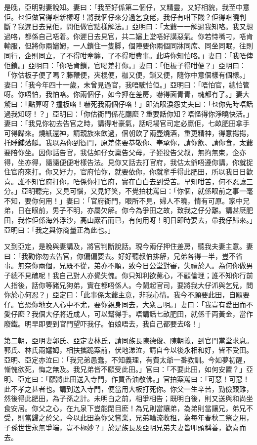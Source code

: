 \documentclass[a5paper, 12pt, openany]{book} %
\begin{document}
	是晚，亞明對妻說知。妻曰：「我至好係第二個仔，又精靈，又好相貌，我至中意佢。乜佢做官得咁新樣呀！將我個仔來分過乞食佬，我仔有咁下賤？佢得咁曉判斷？我遲日去見佢，問佢做官點樣解法。」亞明曰：「太爺一一解過我知咯。我又想過咯，都係自己唔着。你遲日去見官，共二嬸上堂唔好講惡氣。你若恃嘴刁，唔肯輸服，但將你兩嬸姆，一人鎖住一隻脚，個陣要你兩個同牀同席、同坐同眠，往則同行，企則同立，了不得咁牽纏，了不得咁費事。此時你知怕咯。」妻曰：「我唔俾佢鎖。」亞明曰：「你唔肯鎖，官喝差打你。」妻曰：「佢板子得咁便？」亞明曰：「你估板子便了嗎？藤鞭便，夾棍便，枷又便，鎖又便，隨你中意個樣有個樣。」妻曰：「我今年四十一歲，未曾見過官，我唔駛怕佢。」亞明曰：「唔怕官，總怕管呀。你唔怕，我怕咯。你兩個仔，如今押在差房，嚇得面青青，魂都冇了。」妻大驚曰：「點算呀？撞板咯！嚇死我兩個仔咯！」即流眼淚怨丈夫曰：「乜你先時唔話過我知呀！？」亞明曰：「你估衙門係花廳麽？重要話你知？唔怪得你淨曉快活。」妻曰：「我見你初去告官之時，講得咁豪氣，話呢場官司定必贏佢，七畝肥田拿手可得歸來。燒紙還神，請親族來飲過，個朝飲了兩壺燒酒，重更精神，得意揚揚，托睡鋪落艇。我以為你到衙門，原差佬要恭敬你、奉承你，請你飲、請你食，太爺要陪你坐。因你話告官，我估如仔女稟告父母，子姪投告父叔，無拘無束，企亦得，坐亦得，隨隨便便咁樣告法。見你又話去打官府，我估太爺唔遵你講，你就捉住官府來打。你又好力，官府怕你，就要依你，你就拿手得此肥田，所以我日日歡喜。誰不知官府打你，唔係你打官府，實在白白去到受苦。早知咁苦，何不忍讓三分。」亞明聽完，又見可惱，又見好笑，不覺拍枕罵曰：「你個，就係眼前之事一毫不知，要你何用！」妻曰：「官府衙門，眼所不見，婦人不曉，情有可原。家中兄弟，日在眼前，男子不明，亦屬欠解。你今為爭田之故，致我之仔分離。講甚麽肥田，我作佢係海外浮沙，高山巖石而已，有何用呀！明日即時要去，帶我仔歸來。」亞明曰：「我之與你商量正為此也。」

	又到亞定，是晚與妻講及，將官判斷說話。現今兩仔押住差房，聽我夫妻主意。妻曰：「我勸你勿去告官，你偏偏要去。好好聽叔伯排解，兄弟各得一半，豈不省事。無奈你兩個，兄既不從，弟亦不順，致今日公堂對審，失禮於人。為何你做男子總不見醜呢！我自己對人亦覺失愧。你只知利欲薰心，不顧倫理；誰不知你行前人指後，話你等豬兄狗弟，實在都唔係人。今鬧起官司，要將我大仔沠與乞兒，問你於心何忍？」亞定曰：「此事係太爺主意，非我心情。我今不願要此田，自願要仔。官恐你地女人心中不尤，要你親身同去，大衆言明。」妻曰：「我豈有愛田而不愛仔麽？我個大仔將近成人，可以幫得手。唔講話七畝肥田，就係千両黃金，當作廢鐵。明早即要到官門望吓我仔。伯娘唔去，我自己都要去咯！」

	第二朝，亞明妻郭氏、亞定妻林氏，請同族長陳德俊、陳朝義，到官門當堂求息。郭氏、林氏兩嬸姆，相扶攜跪案前，伏地涕泣，請自今以後永相和好，皆不受田。亞明、亞定亦泣曰：「我兄弟愚蠢，不知義理，有費太爺一番教訓。今如夢初醒，慚愧欲死，悔之無及。我兄弟皆不願受此田。」官曰：「不要此田，如何安置？」亞明、亞定曰：「願將此田送入寺門，作買香油敬佛。」官拍案罵曰：「可惡！可惡！此不孝之甚者也。講到送入寺門，便當用大板打死你。你父一生辛苦，勤儉艱難，然後得此肥田，為子孫之計。未明白之前，相爭相告；既明白後，則又送與和尚坐食安居。你父之心，在九泉下豈能閉目麽！為兄則當讓弟，為弟則當讓兄，弟兄不受，則當歸之於父。今以此田為你父嘗業，兄弟輪流收租，為每年春秋二祭之用，子孫世世永無爭端，豈不極妙？」於是族長及亞明兄弟夫妻皆叩頭稱善，歡喜而去。
\end{document}
